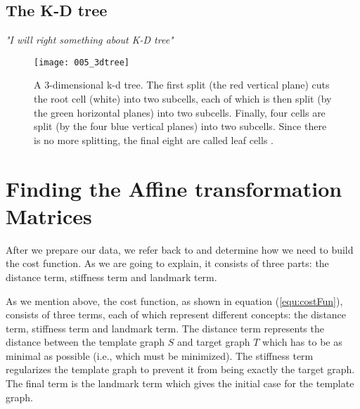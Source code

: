 \documentclass[../structure.tex]{subfiles}
\begin{document}
\subsection{The K-D tree}
\textit{"I will right something about K-D tree"}
\begin{comment}
The K-D tree is a space-partitioning data structure (binary tree) for organizing points where every leaf node is a k-dimensional point. Every non-leaf node can be regarded as implicitly generating a splitting hyperplane that partitions the space into two parts, known as half-spaces. Points which are to the left of this hyperplane are represented by the left subtree of that node and, accordingly, points to the right of the hyperplane are represented by the right subtree. The selection of the hyperplane direction is done in the following way: each  node in the tree is associated with one of k dimensions, with the hyperplane perpendicular to that dimension's axis. For instance, if for a particular split the "x" axis is chosen, all points in the subtree with a smaller "x" value than the node will appear in the left subtree and all points with larger "x" value will be in the right subtree. In this case, the hyperplane would be set by the x-value of the point, and its normal would be the unit x-axis \cite{Bentley1975}.
\end{comment}

\begin{figure}[h!]
\centering
\texttt{[image: 005\_3dtree]}
\captionsetup{justification=centering}
\caption{A 3-dimensional k-d tree. The first split (the red vertical plane) cuts the root cell (white) into two subcells, each of which is then split (by the green horizontal planes) into two subcells. Finally, four cells are split (by the four blue vertical planes) into two subcells. Since there is no more splitting, the final eight are called leaf cells \cite{Wikipedia2006}.}
\label{fig:data}
\end{figure}

\section{Finding the Affine transformation Matrices}
After we prepare our data, we refer back to \cite{Amberg2007} and determine how we need to build the cost function. As we are going to explain, it consists of three parts: the distance term, stiffness term and landmark term.

As we mention above, the cost function, as shown in equation (\ref{equ:costFun}), consists of three terms, each of which represent different concepts: the distance term, stiffness term and landmark term. The distance term represents the distance between the template graph $S$ and target graph $T$ which has to be as minimal as possible (i.e., which must be minimized). The stiffness term regularizes the template graph to prevent it from being exactly the target graph. The final term is the landmark term which gives the initial case for the template graph.
\end{document}
